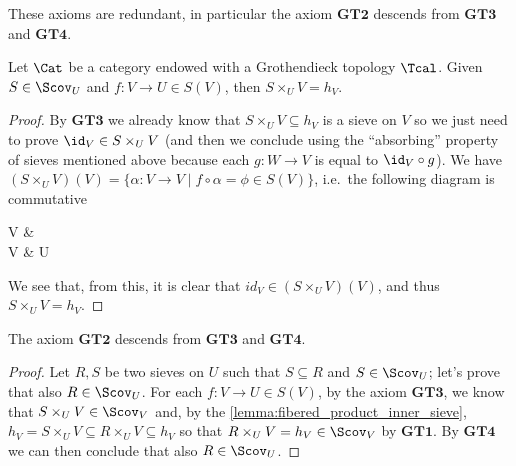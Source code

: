 \documentclass[a4paper]{article}
\begin{document}
            These axioms are redundant, in particular the axiom $\mathbf{GT2}$ descends from $\mathbf{GT3}$ and $\mathbf{GT4}$. 
            \begin{lemma}
                \label{lemma:fibered_product_inner_sieve}
                Let $\Cat$ be a category endowed with a Grothendieck topology $\Tcal$. Given $S \in \Scov_U$ and $f\colon V \to U \in S(V)$, then $S \times_U V = h_V$.
            \end{lemma}
            \begin{proof}
                By $\mathbf{GT3}$ we already know that $S \times_U V \subseteq h_V$ is a sieve on $V$ so we just need to prove $\id_V \in S \times_U V$ (and then we conclude using the ``absorbing'' property of sieves mentioned above because each $g\colon W \to V$ is equal to $\id_V \circ g$). We have $(S \times_U V)(V) = \{\alpha\colon V \to V \mid f \circ \alpha = \phi \in S(V)\}$, i.e.\ the following diagram is commutative
                \begin{diag}
                    V \arrow[rd, "\phi"] \arrow[d, "\alpha"] & \\
                    V \arrow[r, "f"] & U
                \end{diag}
                We see that, from this, it is clear that $id_V \in (S \times_U V)(V)$, and thus $S \times_U V = h_V$.
            \end{proof}

            \begin{prop}
                \label{prop:no_gt2}
                The axiom $\mathbf{GT2}$ descends from $\mathbf{GT3}$ and $\mathbf{GT4}$.
            \end{prop}
            \begin{proof}
                Let $R, S$ be two sieves on $U$ such that $S \subseteq R$ and $S \in \Scov_U$; let's prove that also $R \in \Scov_U$. For each $f\colon V \to U \in S(V)$, by the axiom $\mathbf{GT3}$, we know that $S \times_U V \in \Scov_V$ and, by the \cref{lemma:fibered_product_inner_sieve}, $h_V = S \times_U V \subseteq R \times_U V \subseteq h_V$ so that $R \times_U V = h_V \in \Scov_V$ by $\mathbf{GT1}$. By $\mathbf{GT4}$ we can then conclude that also $R \in \Scov_U$.
            \end{proof}
\end{document}
